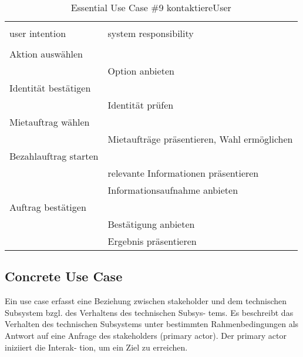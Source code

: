 \begin{table}[H]
\caption{Essential Use Case \#9 kontaktiereUser }
\centering
\begin{tabular}{l l}
\\ [-0.5ex]

\hline\hline
\\ [-0.5ex]
user intention & system responsibility
\\ [1.5ex]
\hline
\\ [-0.5ex]
Aktion auswählen	 		& 											 \\[1ex]
							& Option anbieten							 \\[1ex]
Identität bestätigen		& 											 \\[1ex]
							& Identität prüfen							 \\[1ex]
Mietauftrag wählen		  	& 											 \\[1ex] 
							& Mietaufträge präsentieren, Wahl ermöglichen\\[1ex]
Bezahlauftrag starten		& 											 \\[1ex]
							& relevante Informationen präsentieren		 \\[1ex]
							& Informationsaufnahme anbieten	     		 \\[1ex]
Auftrag bestätigen			&	     									 \\[1ex]
							& Bestätigung anbieten				   		 \\[1ex]
							& Ergebnis präsentieren			    		 \\[1ex]

\hline
\end{tabular}
\label{tab:statuscodes}
\end{table}

\newpage
\subsection{Concrete Use Case}
Ein use case erfasst eine Beziehung zwischen stakeholder und dem technischen Subsystem bzgl. des Verhaltens des technischen Subsys- tems. Es beschreibt das Verhalten des technischen Subsystems unter bestimmten Rahmenbedingungen als Antwort auf eine Anfrage des stakeholders (primary actor). Der primary actor iniziiert die Interak- tion, um ein Ziel zu erreichen.

